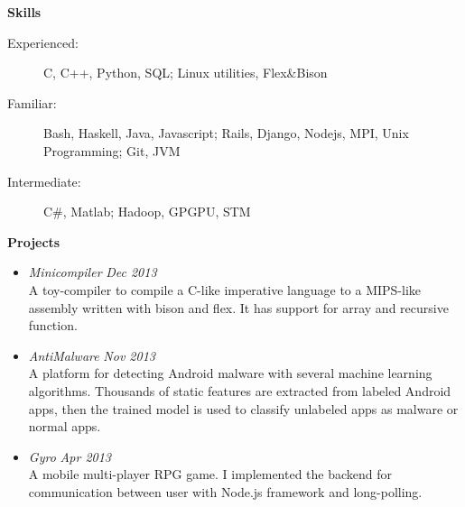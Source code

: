 \documentclass[letterpaper,11pt]{article}
\newcommand{\resheading}[1]{{\large \colorbox{mygrey}{\begin{minipage}{\textwidth}{\textbf{#1 \vphantom{p\^{E}}}}\end{minipage}}}}
\begin{document}
\resheading{Skills}
    \begin{description}
    \item[Experienced:] { \footnotesize C, C++, Python, SQL; Linux utilities, Flex\&Bison}
    \item[Familiar:] { \footnotesize Bash, Haskell, Java, Javascript; Rails, Django, Nodejs, MPI, Unix Programming; Git, JVM}
    \item[Intermediate:] { \footnotesize C\#, Matlab; Hadoop, GPGPU, STM}
    \end{description} %
\resheading{Projects}
    \begin{itemize}
    \item 
    {\sl Minicompiler} \hfill \textit{Dec 2013}\\
    {\footnotesize
        {A toy-compiler to compile a C-like imperative language to a MIPS-like assembly written with bison and flex. It has support for array and recursive function.}
    }
    \item
    {\sl AntiMalware} \hfill \textit{Nov 2013}\\
    { \footnotesize 
        {A platform for detecting Android malware with several machine learning algorithms. Thousands of static features are extracted from labeled Android apps, then the trained model is used to classify unlabeled apps as malware or normal apps.}
    }
\item
    {\sl Gyro} \hfill \textit{Apr 2013}\\ 
    { \footnotesize A mobile multi-player RPG game. I implemented the backend for communication between user with Node.js framework and long-polling.}
\end{itemize}
\end{document}
